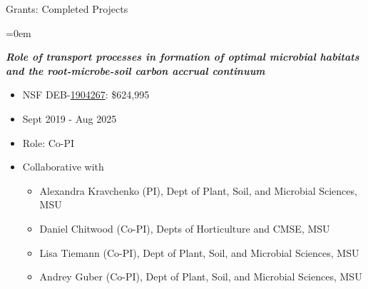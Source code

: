 \documentclass{resume} %
\begin{document}
\begin{rSection}{Grants: Completed Projects}
\begin{itemize}{}{\leftmargin=0em}
\end{itemize}
\textbf{\textit{Role of transport processes in formation of optimal microbial habitats and the root-microbe-soil carbon accrual continuum}}
\vspace{-.1in}
\begin{itemize}{}{\leftmargin=0em}
   \itemsep -0.6em %
   \item
NSF DEB-\href{https://nsf.gov/awardsearch/showAward?AWD_ID=1904267}{1904267}: \$624,995
\item
Sept 2019 - Aug 2025
   \item
Role: Co-PI
\item Collaborative with
   \vspace{-.1in}
\begin{itemize}{}{\leftmargin=0em}
   \itemsep -0.6em %
  \item Alexandra Kravchenko (PI),  Dept of Plant, Soil, and Microbial Sciences, MSU
  \item Daniel Chitwood (Co-PI), Depts of Horticulture and CMSE, MSU
  \item Lisa Tiemann (Co-PI), Dept of Plant, Soil, and Microbial Sciences, MSU
  \item Andrey Guber (Co-PI), Dept of Plant, Soil, and Microbial Sciences, MSU
\end{itemize}
\end{itemize}


\end{rSection}
\end{document}
